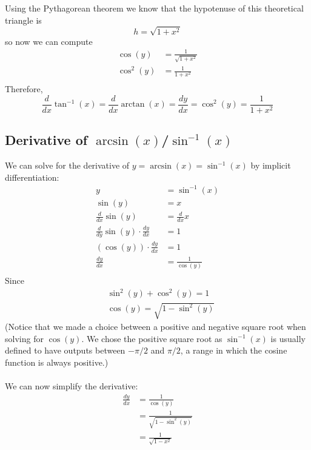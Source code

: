 \documentclass{report}
\begin{document}
Using the Pythagorean theorem we know that the hypotenuse of this theoretical triangle is
\begin{equation*}
h=\sqrt{1+x^2}
\end{equation*}
so now we can compute
\begin{align*}
\cos(y)&=\frac{1}{\sqrt{1+x^2}}\\
\cos^2(y)&=\frac{1}{1+x^2}\\
\end{align*}
Therefore,
\begin{equation*}
\frac{d}{dx}\tan^{-1}(x)=\frac{d}{dx}\arctan(x)=\frac{dy}{dx}=\cos^2(y)=\frac{1}{1+x^2}
\end{equation*}
\newpage

\subsection{Derivative of $\arcsin(x)$/$\sin^{-1}(x)$} %
\label{fundamentals:differentiation:arcsin}
We can solve for the derivative of $y=\arcsin(x)=\sin^{-1}(x)$ by implicit differentiation:
\begin{align*}
y&=\sin^{-1}(x)\\
\sin(y)&=x\\
\frac{d}{dx}\sin(y)&=\frac{d}{dx}x\\
\frac{d}{dy}\sin(y)\cdot\frac{dy}{dx}&=1\\
(\cos(y))\cdot\frac{dy}{dx}&=1\\
\frac{dy}{dx}&=\frac{1}{\cos(y)}\\
\end{align*}
Since
\begin{align*}
&\sin^2(y)+\cos^2(y)=1\\
&\cos(y)=\sqrt{1-\sin^2(y)}
\end{align*}
(Notice that we made a choice between a positive and negative square root when solving for 
$\cos(y)$. We chose the positive square root as $\sin^{-1}(x)$ is usually defined to have outputs
between $-\pi/2$ and $\pi/2$, a range in which the cosine function is always positive.)\\
\vspace{2mm}\\
We can now simplify the derivative:
\begin{align*}
\frac{dy}{dx}&=\frac{1}{\cos(y)}\\
&=\frac{1}{\sqrt{1-\sin^2(y)}}\\
&=\frac{1}{\sqrt{1-x^2}}
\end{align*}
\newpage
\end{document}
